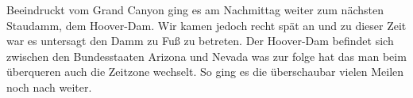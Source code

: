 \newpage
\thispagestyle{empty}
\newpage

Beeindruckt vom Grand Canyon ging es am Nachmittag weiter zum nächsten Staudamm, dem Hoover-Dam.
Wir kamen jedoch recht spät an und zu dieser Zeit war es untersagt den Damm zu Fuß zu betreten.
Der Hoover-Dam befindet sich zwischen den Bundesstaaten Arizona und Nevada was zur folge hat das man beim überqueren auch die Zeitzone wechselt.
So ging es die überschaubar vielen Meilen noch nach  weiter.

